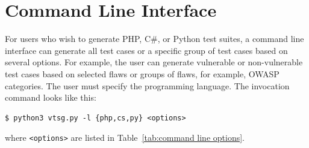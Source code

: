 \documentclass[12pt]{article}
\newcommand{\CSharp}{C{\fontseries{b}\selectfont\#}}
\begin{document}
\section{Command Line Interface}
\label{sec:command line interface}

For users who wish to generate PHP, \CSharp, or Python test suites, a command line
interface
can generate all test cases or a specific group of test cases based on several
options.  For example, the user can generate vulnerable or non-vulnerable test cases
based on selected flaws or groups of flaws, for example, OWASP categories.
The user must specify the
programming language.  The invocation command looks like this:
\begin{verbatim}
$ python3 vtsg.py -l {php,cs,py} <options>
\end{verbatim}
\newcommand{\texlangle}{$\langle$}
\newcommand{\texrangle}{$\rangle$}
where \verb|<options>| are listed in
Table~\ref{tab:command line options}.
\end{document}
